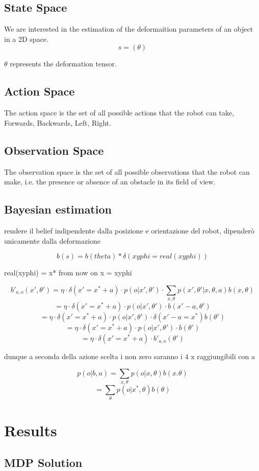 \documentclass[12pt,a4paper]{article}
\begin{document}
\subsection{State Space}
We are interested in the estimation of the deformaition parameters of an object in a 2D space.
$$s = (\theta)$$

$\theta$ represents the deformation tensor.

\subsection{Action Space}
The action space is the set of all possible actions that the robot can take, 
Forwards, Backwards, Left, Right.
\subsection{Observation Space}
The observation space is the set of all possible observations that the robot can make,
i.e. the presence or absence of an obstacle in its field of view.
\subsection{Bayesian estimation}

rendere il belief indipendente dalla posizione e orientazione del robot, dipenderò unicamente dalla deformazione

$$b(s) = b(theta) * \delta(xyphi = real(xyphi))$$

real(xyphi) = x*
from now on x = xyphi



$$b'_{a,o}(x',\theta') = \eta \cdot \delta(x'=x^*+a) \cdot p(o|x',\theta') \cdot \sum_{x,\theta}p(x',\theta'|x,\theta,a)b(x,\theta)$$
$$ = \eta \cdot \delta(x'=x^*+a) \cdot p(o|x',\theta') \cdot b(x'-a,\theta') $$
$$ = \eta \cdot \delta(x'=x^*+a) \cdot p(o|x',\theta') \cdot \delta (x'-a = x^* )b(\theta') $$
$$ = \eta \cdot \delta(x'=x^*+a) \cdot p(o|x',\theta') \cdot b(\theta') $$
$$ = \eta \cdot \delta(x'=x^*+a) \cdot b'_{a,o}(\theta')$$

dunque a seconda della azione scelta i non zero saranno i 4 x raggiungibili con a

$$p(o|b,a) = \sum_{x,\theta}p(o|x,\theta)b(x.\theta)$$
$$ = \sum_{\theta}p(o|x^*,\theta)b(\theta)$$
\newpage
\section{Results}
\subsection{MDP Solution}
\end{document}
